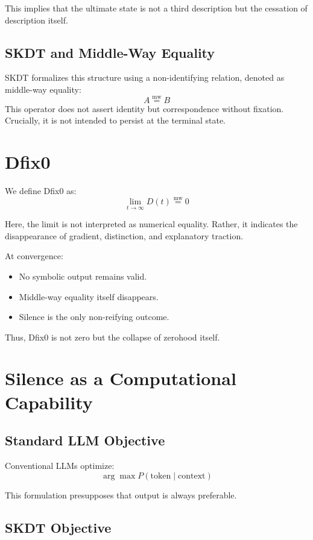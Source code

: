 \documentclass[11pt]{article}
\begin{document}
This implies that the ultimate state is not a third description but the
cessation of description itself.

\subsection{SKDT and Middle-Way Equality}

SKDT formalizes this structure using a non-identifying relation,
denoted as middle-way equality:
\[
A \mathrel{\overset{\mathrm{mw}}{=}} B
\]
This operator does not assert identity but correspondence without fixation.
Crucially, it is not intended to persist at the terminal state.

\section{Dfix0}

We define Dfix0 as:
\[
\lim_{t \to \infty} D(t) \mathrel{\overset{\mathrm{mw}}{=}} 0
\]

Here, the limit is not interpreted as numerical equality.
Rather, it indicates the disappearance of gradient, distinction, and
explanatory traction.

At convergence:
\begin{itemize}
\item No symbolic output remains valid.
\item Middle-way equality itself disappears.
\item Silence is the only non-reifying outcome.
\end{itemize}

Thus, Dfix0 is not zero but the collapse of zerohood itself.

\section{Silence as a Computational Capability}

\subsection{Standard LLM Objective}

Conventional LLMs optimize:
\[
\arg\max P(\text{token} \mid \text{context})
\]

This formulation presupposes that output is always preferable.

\subsection{SKDT Objective}
\end{document}
